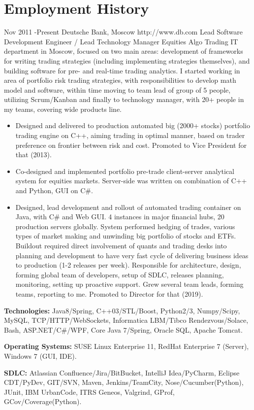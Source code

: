 \documentclass[10pt]{article} %
\begin{document}

\section{Employment History}

\job
{Nov 2011 -}{Present}
{Deutsche Bank, Moscow}
{http://www.db.com}
{Lead Software Development Engineer / Lead Technology Manager}
{Equities Algo Trading IT department in Moscow, focused on two main areas: development of frameworks for
writing trading strategies (including implementing strategies themselves), and building software 
for pre- and real-time  trading analytics. I started working in area of portfolio risk trading strategies,
with responsibilities to develop math model and software, within time moving to team lead of group of 5 people,
utilizing Scrum/Kanban and finally to technology manager, with 20+ people in my teams,
covering wide products line.}
{\begin{itemize}
\item{Designed and delivered to production automated big (2000+ stocks) portfolio trading engine on C++,
aiming trading in optimal manner, based on trader preference on frontier between risk and cost. 
Promoted to Vice President for that (2013).}
\item{Co-designed and implemented portfolio pre-trade client-server analytical system for equities markets.
Server-side was written on combination of C++ and Python, GUI on C\#.}
\item{Designed, lead development and rollout of automated trading container on Java, with C\# and Web GUI.
4 instances in major financial hubs, 20 production servers globally. System performed hedging of trades,
various types of market making and unwinding big portfolio of stocks and ETFs. Buildout required direct
involvement of quants and trading desks into planning and development to have very fast cycle of delivering
business ideas to production (1-2 releases per week). Responsible for architecture, design, forming
global team of developers, setup of SDLC, releases planning, monitoring, setting up proactive support.
Grew several team leads, forming teams, reporting to me. Promoted to Director for that (2019).}
\end{itemize}}
{\rule{0mm}{5mm}\textbf{Technologies:} Java8/Spring, C++03/STL/Boost, Python2/3, Numpy/Scipy, MySQL, TCP/HTTP/WebSockets,
Informatica LBM/Tibco Rendezvous/Solace, Bash, ASP.NET/C\#/WPF, Core Java 7/Spring, Oracle SQL, Apache Tomcat.\\
\rule{0mm}{5mm}\textbf{Operating Systems:} SUSE Linux Enterprise 11, RedHat Enterprise 7 (Server), Windows 7 (GUI, IDE).\\
\rule{0mm}{5mm}\textbf{SDLC:} Atlassian Confluence/Jira/BitBucket, IntelliJ Idea/PyCharm, Eclipse CDT/PyDev, GIT/SVN,
Maven, Jenkins/TeamCity, Nose/Cucumber(Python), JUnit, IBM UrbanCode, ITRS Geneos, Valgrind, GProf, GCov/Coverage(Python).
}
\end{document}
